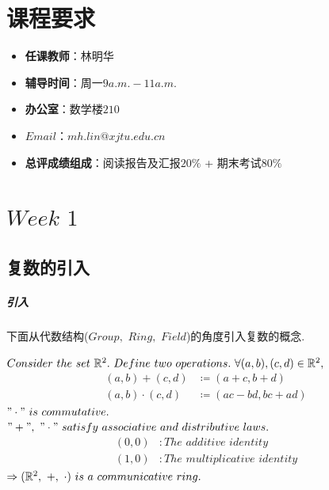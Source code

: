 \ifx\allfiles\undefined


	\else
	\fi

\chapter{课程要求}
	\begin{itemize}
		\item \textbf{任课教师}：林明华
		
		\item \textbf{辅导时间}：周一$9a.m. - 11a.m.$
		
		\item \textbf{办公室}：数学楼$210$
		
		\item \textbf{$Email$}：$mh.lin@xjtu.edu.cn$
		
		\item \textbf{总评成绩组成}：阅读报告及汇报$20\%$ + 期末考试$80\%$
	\end{itemize}

\chapter{$Week \,\, 1$}
\section{复数的引入}
\paragraph{引入}
	\begin{center}
		下面从代数结构($Group , \,\, Ring , \,\, Field$)的角度引入复数的概念.
	\end{center}
	$Consider \,\, the \,\, set \,\, \mathbb{R}^2 . \,\, Define \,\, two \,\, operations . \,\, \forall (a , b) , (c , d) \in \mathbb{R}^2 , $
	\begin{align}
		(a , b) + (c , d) &\coloneqq (a + c , b + d)\\
		(a , b) \cdot (c , d) &\coloneqq (ac - bd , bc + ad)
	\end{align}
	$"\cdot" \,\, is \,\, commutative.$\\
	$"+" , \,\, "\cdot" \,\, satisfy \,\, associative \,\, and \,\, distributive \,\, laws.$
	\begin{align}
		(0 , 0) &: The \,\, additive \,\, identity \\
		(1 , 0) &: The \,\, multiplicative \,\, identity
	\end{align}
	$\Rightarrow (\mathbb{R}^2 , \,\, + , \,\, \cdot) \,\, is \,\, a \,\, communicative \,\, ring.$
	
